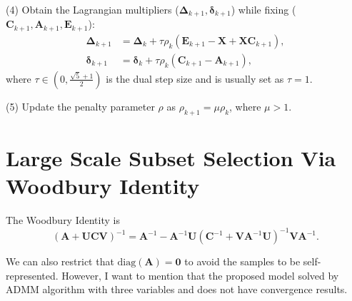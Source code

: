 \documentclass[10pt,twocolumn,letterpaper]{article}
\begin{document}
(4) Obtain the Lagrangian multipliers ($\bm{\Delta}_{k+1},\bm{\delta}_{k+1}$) while fixing ($\bm{C}_{k+1},\bm{A}_{k+1},\bm{E}_{k+1}$):
\begin{equation}
\begin{split}
\label{e10}
\bm{\Delta}_{k+1}
&
=
\bm{\Delta}_{k}
+
\tau\rho_{k}
(\bm{E}_{k+1}-\bm{X}+\bm{X}\bm{C}_{k+1})
,
\\
\bm{\delta}_{k+1}
&
=
\bm{\delta}_{k}
+
\tau\rho_{k}
(\bm{C}_{k+1}-\bm{A}_{k+1})
,
\end{split}
\end{equation}
where $\tau\in(0,\frac{\sqrt{5}+1}{2})$ is the dual step size and is usually set as $\tau=1$.

(5) Update the penalty parameter $\rho$ as $\rho_{k+1}=\mu\rho_{k}$, where $\mu>1$.


\section{Large Scale Subset Selection Via Woodbury Identity}

The Woodbury Identity is 
\begin{equation}
(
\bm{A}
+
\bm{U}
\bm{C}
\bm{V}
)^{-1}
=
\bm{A}^{-1}
-
\bm{A}^{-1}
\bm{U}
(
\bm{C}^{-1}
+
\bm{V}\bm{A}^{-1}\bm{U}
)^{-1}
\bm{V}\bm{A}^{-1}
.
\end{equation}



We can also restrict that $\text{diag}(\bm{A})=\bm{0}$ to avoid the samples to be self-represented. However, I want to mention that the proposed model solved by ADMM algorithm with three variables and does not have convergence results.
\end{document}
